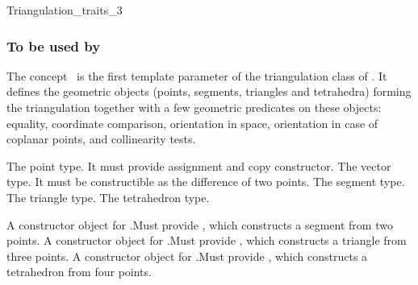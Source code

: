 

\begin{ccRefConcept}{Triangulation_traits_3}


\subsubsection{To be used by \protect {}}

\ccDefinition
The concept \ccRefName\ is the first template parameter of the
triangulation class  of \cgal. It
defines the geometric
objects (points, segments, triangles and tetrahedra) forming the
triangulation together with a few geometric predicates on these objects:
equality, coordinate comparison, orientation in space, orientation
in case of coplanar points, and collinearity tests.

\ccTypes
{}

{The point type. It must provide assignment and copy constructor.}
\ccGlue
{}
{The vector type. It must be constructible as the difference of two points.}
\ccGlue
{}
{The  segment type.}
\ccGlue
{}
{The triangle type.}
\ccGlue
{}
{The tetrahedron type.}

 {A constructor object for
.Must provide , which constructs a  segment from two points.}
\ccGlue
{} {A constructor object for
.Must provide , which constructs a triangle from three points.}
\ccGlue
{} {A constructor object for
.Must provide , which constructs a tetrahedron from four points.}


\end{ccRefConcept}
